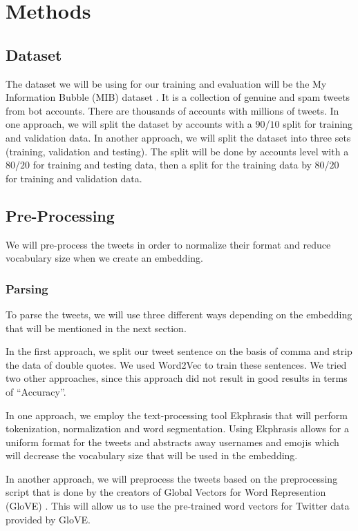 \section{Methods}
\label{sec:methods}

\subsection{Dataset} The dataset we will be using for our training and
evaluation will be the My Information Bubble (MIB) dataset
\citep{Cresci:2017:PSS:3041021.3055135}. It is a collection of genuine
and spam tweets from bot accounts. There are thousands of accounts
with millions of tweets. In one approach, we will split the dataset by accounts with a
$90$/$10$ split for training and validation data. In another approach, we will split the dataset into three sets (training, validation and testing). The split will be done by accounts level with a $80$/$20$ for training and testing data, then a split for the training data by $80$/$20$ for training and validation data. 

\subsection{Pre-Processing} We will pre-process the tweets in order to
normalize their format and reduce vocabulary size when we create an
embedding.

\subsubsection{Parsing} To parse the tweets, we will use three different ways depending on the embedding that will be mentioned in the next section. 

In the first approach, we split our tweet sentence on the basis of comma and strip the data of double quotes. We used Word2Vec to train these sentences. We tried two other approaches, since this approach did not result in good results in terms of ``Accuracy''.

In one approach, we employ the
text-processing tool Ekphrasis
\citep{baziotis-pelekis-doulkeridis:2017:SemEval2} that will perform
tokenization, normalization and word segmentation. Using Ekphrasis
allows for a uniform format for the tweets and abstracts away
usernames and emojis which will decrease the vocabulary size that will
be used in the embedding. 

In another approach, we will preprocess the tweets based on the preprocessing script that is done by the creators of Global Vectors for Word Represention (GloVE) \citep{pennington-etal-2014-glove}. This will allow us to use the pre-trained word vectors for Twitter data provided by GloVE. 


